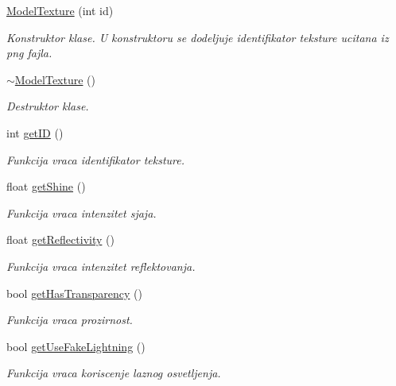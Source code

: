 \begin{DoxyCompactItemize}
\item 
\hyperlink{classtexture_1_1Texture_a8a404382554b8e2625978824202c42b9}{Model\+Texture} (int id)
\begin{DoxyCompactList}\small\item\em Konstruktor klase. U konstruktoru se dodeljuje identifikator teksture ucitana iz png fajla. \end{DoxyCompactList}\item 
\hyperlink{classtexture_1_1Texture_ab0ce63043b8241b064a2c233ec24bfae}{$\sim$\+Model\+Texture} ()
\begin{DoxyCompactList}\small\item\em Destruktor klase. \end{DoxyCompactList}\item 
int \hyperlink{classtexture_1_1Texture_a3eeda8235d9c4cfccccc2ac805eeb864}{get\+ID} ()
\begin{DoxyCompactList}\small\item\em Funkcija vraca identifikator teksture. \end{DoxyCompactList}\item 
float \hyperlink{classtexture_1_1Texture_a2336ba8c1ccc1eea9419fb2cd3773888}{get\+Shine} ()
\begin{DoxyCompactList}\small\item\em Funkcija vraca intenzitet sjaja. \end{DoxyCompactList}\item 
float \hyperlink{classtexture_1_1Texture_a613024c969ec176a1add0c20c3f98969}{get\+Reflectivity} ()
\begin{DoxyCompactList}\small\item\em Funkcija vraca intenzitet reflektovanja. \end{DoxyCompactList}\item 
bool \hyperlink{classtexture_1_1Texture_adc0735b6b9c1df9f2c525f0663306cd3}{get\+Has\+Transparency} ()
\begin{DoxyCompactList}\small\item\em Funkcija vraca prozirnost. \end{DoxyCompactList}\item 
bool \hyperlink{classtexture_1_1Texture_adc202fd47232d085312fea26bc17d69e}{get\+Use\+Fake\+Lightning} ()
\begin{DoxyCompactList}\small\item\em Funkcija vraca koriscenje laznog osvetljenja. \end{DoxyCompactList}\item 

\end{DoxyCompactItemize}

